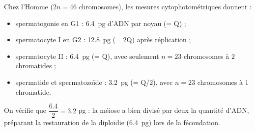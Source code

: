 \documentclass[11pt]{article}
\begin{document}
\begin{exemplebox}
Chez l'Homme ($2n = 46$ chromosomes), les mesures cytophotométriques donnent :
\begin{itemize}
\item spermatogonie en G1 : \SI{6,4}{pg} d'ADN par noyau (= Q) ;
\item spermatocyte I en G2 : \SI{12,8}{pg} (= 2Q) après réplication ;
\item spermatocyte II : \SI{6,4}{pg} (= Q), avec seulement $n = 23$ chromosomes à 2 chromatides ;
\item spermatide et spermatozoïde : \SI{3,2}{pg} (= Q/2), avec $n = 23$ chromosomes à 1 chromatide.
\end{itemize}
On vérifie que $\dfrac{\num{6,4}}{2} = \num{3,2}$ pg : la méiose a bien divisé par deux la quantité d'ADN, préparant la restauration de la diploïdie (\SI{6,4}{pg}) lors de la fécondation.
\end{exemplebox}
\end{document}
